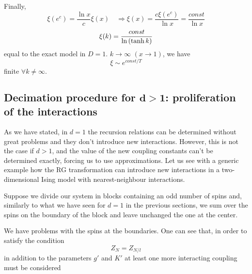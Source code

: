 \documentclass[../main/main.tex]{subfiles}
\begin{document}
Finally,
\begin{equation}
  \xi (e^c) = \frac{\ln{x} }{c} \xi (x) \quad \Rightarrow \xi (x) = \frac{c \xi (e^c)}{\ln{x} } = \frac{const}{\ln{x} }
\end{equation}
\begin{equation}
  \xi (k) = \frac{const}{\ln{\qty(\tanh k) } }
\end{equation}
equal to the exact model in \( D=1 \).
\( k \rightarrow \infty  \) \( (x \rightarrow 1) \), we have
\begin{equation}
  \xi \sim e^{const/T}
\end{equation}
finite \( \forall k \neq \infty  \).


























\subsection{Decimation procedure for \( \pmb{d>1} \): proliferation of the interactions}
As we have stated, in \( d=1 \) the recursion relations can be determined without great problems and they don't introduce new interactions. However, this is not the case if \( d>1 \), and the value of the new coupling constants can't be determined exactly, forcing us to use approximations. Let us see with a generic example how the RG transformation can introduce new interactions in a two-dimensional Ising model with nearest-neighbour interactions.

Suppose we divide our system in blocks containing an odd number of spins and, similarly to what we have seen for \( d=1 \) in the previous sections, we sum over the spins on the boundary of the block and leave unchanged the one at the center.

We have problems with the spins at the boundaries. One can see that, in order to satisfy the condition
\begin{equation*}
  Z_N = Z_{N/l}
\end{equation*}
in addition to the parameters \( g' \) and \( K' \) at least one more interacting coupling must be considered
\end{document}
